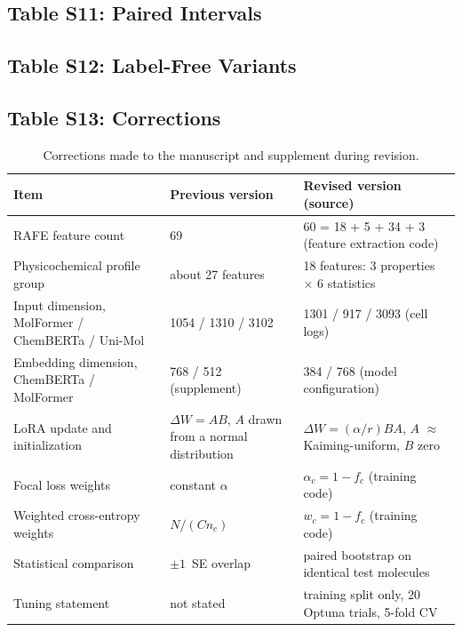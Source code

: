 \documentclass[9pt,a4paper]{article}
\begin{document}
\subsection*{Table S11: Paired Intervals}%

{\scriptsize}

\subsection*{Table S12: Label-Free Variants}%
{\scriptsize}

\subsection*{Table S13: Corrections}%

\begin{table}[htbp]
\centering
\caption{Corrections made to the manuscript and supplement during revision.}
\label{tab:corrections}
\begin{tabular}{p{4.2cm}p{4.3cm}p{5.2cm}}
\toprule
Item & Previous version & Revised version (source) \\
\midrule
RAFE feature count & 69 & 60 = 18 + 5 + 34 + 3 (feature extraction code) \\
Physicochemical profile group & about 27 features & 18 features: 3 properties $\times$ 6 statistics \\
Input dimension, MolFormer / ChemBERTa / Uni-Mol & 1054 / 1310 / 3102 & 1301 / 917 / 3093 (cell logs) \\
Embedding dimension, ChemBERTa / MolFormer & 768 / 512 (supplement) & 384 / 768 (model configuration) \\
LoRA update and initialization & $\Delta W = AB$, $A$ drawn from a normal distribution & $\Delta W = (\alpha/r)BA$, $A$ $\approx$ Kaiming-uniform, $B$ zero \\
Focal loss weights & constant $\alpha$ & $\alpha_c = 1 - f_c$ (training code) \\
Weighted cross-entropy weights & $N/(C n_c)$ & $w_c = 1 - f_c$ (training code) \\
Statistical comparison & $\pm1$~SE overlap & paired bootstrap on identical test molecules \\
Tuning statement & not stated & training split only, 20 Optuna trials, 5-fold CV \\
\bottomrule
\end{tabular}
\end{table}
\end{document}
